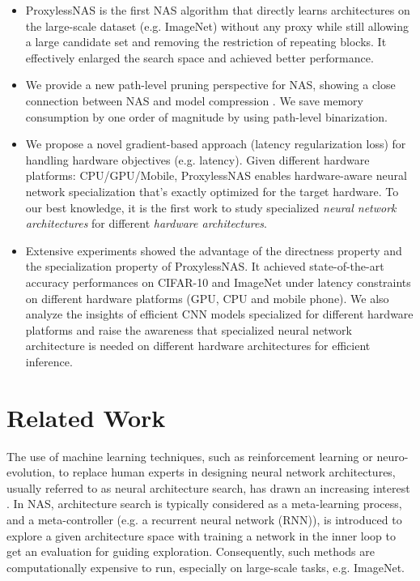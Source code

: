 \documentclass{article} \usepackage{iclr2019_conference,times}
\begin{document}
\begin{itemize}
\item ProxylessNAS is the first NAS algorithm that directly learns architectures on the large-scale dataset (e.g. ImageNet) without any proxy while still allowing a large candidate set and removing the restriction of repeating blocks. It effectively enlarged the search space and achieved better performance. 
    \item We provide a new path-level pruning perspective for NAS, showing a close connection between NAS and model compression \citep{han2015deep}. We save memory consumption by one order of magnitude by using path-level binarization.
    \item We propose a novel gradient-based approach (latency regularization loss) for handling hardware objectives (e.g. latency). Given different hardware platforms: CPU/GPU/Mobile, ProxylessNAS enables hardware-aware neural network specialization that's exactly optimized for the target hardware. To our best knowledge, it is the first work to study specialized \emph{neural network architectures} for different \emph{hardware architectures}. \item Extensive experiments showed the advantage of the directness property and the specialization property of ProxylessNAS. It achieved state-of-the-art accuracy performances on CIFAR-10 and ImageNet under latency constraints on different hardware platforms (GPU, CPU and mobile phone). We also analyze the insights of efficient CNN models specialized for different hardware platforms and raise the awareness that specialized neural network architecture is needed on different hardware architectures for efficient inference. 
\end{itemize}
 
\section{Related Work}
The use of machine learning techniques, such as reinforcement learning or neuro-evolution, to replace human experts in designing neural network architectures, usually referred to as neural architecture search, has drawn an increasing interest \citep{zoph2016neural,liu2017progressive,liu2017hierarchical,liu2018darts,cai2018efficient,cai2018path,pham2018efficient,brock2017smash,bender2018understanding,elsken2017simple,elsken2018neural,kamath2018neural}. In NAS, architecture search is typically considered as a meta-learning process, and a meta-controller (e.g. a recurrent neural network (RNN)), is introduced to explore a given architecture space with training a network in the inner loop to get an evaluation for guiding exploration. Consequently, such methods are computationally expensive to run, especially on large-scale tasks, e.g. ImageNet. 
\end{document}
